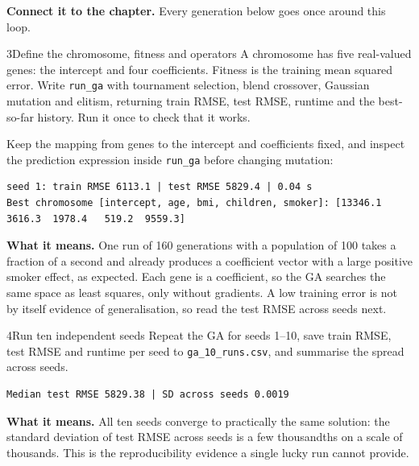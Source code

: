 \textbf{Connect it to the chapter.} Every generation below goes once around this loop.


\begin{labquestion}{3}{Define the chromosome, fitness and operators}
A chromosome has five real-valued genes: the intercept and four coefficients. Fitness is the training mean squared error. Write \texttt{run\_ga} with tournament selection, blend crossover, Gaussian mutation and elitism, returning train RMSE, test RMSE, runtime and the best-so-far history. Run it once to check that it works.
\end{labquestion}
\begin{labanswer}
Keep the mapping from genes to the intercept and coefficients fixed, and inspect the prediction expression inside \texttt{run\_ga} before changing mutation:



\begin{refoutput}
\begin{lstlisting}[style=utpterminal]
seed 1: train RMSE 6113.1 | test RMSE 5829.4 | 0.04 s
Best chromosome [intercept, age, bmi, children, smoker]: [13346.1  3616.3  1978.4   519.2  9559.3]
\end{lstlisting}
\end{refoutput}

\textbf{What it means.} One run of 160 generations with a population of 100 takes a fraction of a second and already produces a coefficient vector with a large positive smoker effect, as expected. Each gene is a coefficient, so the GA searches the same space as least squares, only without gradients. A low training error is not by itself evidence of generalisation, so read the test RMSE across seeds next.
\end{labanswer}

\begin{labquestion}{4}{Run ten independent seeds}
Repeat the GA for seeds 1--10, save train RMSE, test RMSE and runtime per seed to \texttt{ga\_10\_runs.csv}, and summarise the spread across seeds.
\end{labquestion}
\begin{labanswer}

\begin{refoutput}
\begin{lstlisting}[style=utpterminal]
Median test RMSE 5829.38 | SD across seeds 0.0019
\end{lstlisting}
\end{refoutput}

\textbf{What it means.} All ten seeds converge to practically the same solution: the standard deviation of test RMSE across seeds is a few thousandths on a scale of thousands. This is the reproducibility evidence a single lucky run cannot provide.
\end{labanswer}

